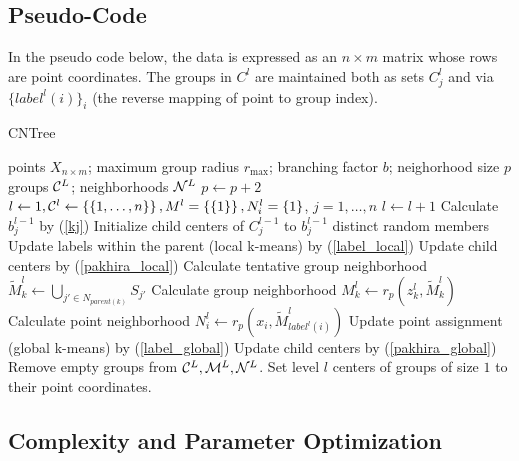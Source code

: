 \documentclass[11pt]{article}
\newcommand{\lp}{\left(}
\newcommand{\rp}{\right)}
\newcommand{\lb}{\left\{}
\newcommand{\rb}{\right\}}
\newcommand{\rmax}{r_{\text{max}}}
\newcommand{\cC}{{\cal C}}
\newcommand{\cN}{{\cal N}}
\newcommand{\cM}{{\cal M}}
\begin{document}
\subsection{Pseudo-Code}
In the pseudo code below, the data is expressed as an $n \times m$ matrix whose rows are point coordinates. The groups in $C^l$ are maintained both as sets $C^l_j$ and via $\{label^l(i)\}_i$ (the reverse mapping of point to group index).

\begin{algorithm}
\caption{CNTree}
\label{alg1}
\begin{algorithmic}[1]
\REQUIRE points $X_{n \times m}$; maximum group radius $\rmax$; branching factor $b$; neighorhood size $p$
\ENSURE groups $\cC^L$; neighborhoods $\cN^L$
\STATE $p \leftarrow p+2$
\STATE $l \leftarrow 1, \cC^l \leftarrow \lb\lb 1,\dots,n\rb \rb, M^l = \lb \lb 1 \rb \rb, N^l_i = \lb 1 \rb $, $j=1,\dots,n$
	\STATE $l \leftarrow l+1$
		\STATE Calculate $b^{l-1}_j$ by (\ref{kj})
		\STATE Initialize child centers of $C^{l-1}_j$ to $b^{l-1}_j$ distinct random members
	\ENDFOR
		\STATE Update labels within the parent (local k-means) by (\ref{label_local})
		\STATE Update child centers by (\ref{pakhira_local})
	\ENDFOR
			\STATE Calculate tentative group neighborhood $\tilde{M}^l_k \leftarrow \bigcup_{j' \in N_{parent(k)}} S_{j'}$
		\ENDFOR
				\STATE Calculate group neighborhood $M^l_k \leftarrow r_p\lp z^l_k, \tilde{M}^l_k \rp$
			\ENDFOR
				\STATE Calculate point neighborhood $N^l_i \leftarrow r_p\lp x_i, \tilde{M}^l_{label^l(i)} \rp$
			\ENDFOR
		\ENDIF
		\STATE Update point assignment (global k-means) by (\ref{label_global})
		\STATE Update child centers by (\ref{pakhira_global})
	\ENDFOR
	\STATE Remove empty groups from $\cC^L, \cM^L, \cN^L$.
	\STATE Set level $l$ centers of groups of size $1$ to their point coordinates.
\ENDWHILE
\end{algorithmic}
\end{algorithm}

\subsection{Complexity and Parameter Optimization}
\end{document}
